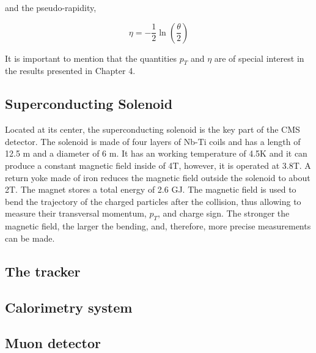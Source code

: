 and the pseudo-rapidity,

\begin{equation}
\eta = -\frac{1}{2}\ln\left(\frac{\theta}{2}\right)
\end{equation}

It is important to mention that the quantities $p_T$ and $\eta$ are of special interest in the results presented in Chapter 4.

\subsection{Superconducting Solenoid}
Located at its center, the superconducting solenoid is the key part of the CMS detector. The solenoid is made of four layers of Nb-Ti coils and has a length of 12.5 m and a diameter of 6 m. It has an working temperature of 4.5K and it can produce a constant magnetic field inside of 4T, however, it is operated at 3.8T. A return yoke made of iron reduces the magnetic field outside the solenoid to about 2T. The magnet stores a total energy of 2.6 GJ. The magnetic field is used to bend the trajectory of the charged particles after the collision, thus allowing to measure their transversal momentum, $p_T$, and charge sign. The stronger the magnetic field, the larger the bending, and, therefore, more precise measurements can be made.

\subsection{The tracker}
\subsection{Calorimetry system}
\subsection{Muon detector}
